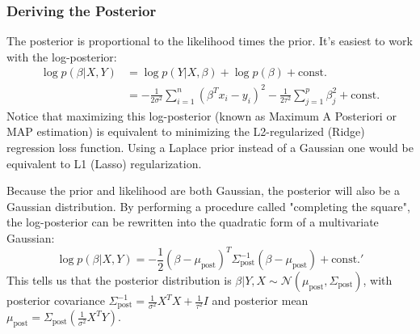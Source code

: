 \documentclass{article}
\begin{document}
\begin{multicols}{2}
	\subsubsection{Deriving the Posterior}
	The posterior is proportional to the likelihood times the prior. It's easiest to work with the log-posterior:
	\begin{align*}
		\log p(\beta|X, Y) & = \log p(Y|X, \beta) + \log p(\beta) + \text{const.}                                                                     \\
		                   & = -\frac{1}{2\sigma^2} \sum_{i=1}^{n} (\beta^T x_i - y_i)^2 - \frac{1}{2\tau^2} \sum_{j=1}^{p} \beta_j^2 + \text{const.}
	\end{align*}
	Notice that maximizing this log-posterior (known as Maximum A Posteriori or MAP estimation) is equivalent to minimizing the L2-regularized (Ridge) regression loss function. Using a Laplace prior instead of a Gaussian one would be equivalent to L1 (Lasso) regularization.

	Because the prior and likelihood are both Gaussian, the posterior will also be a Gaussian distribution. By performing a procedure called "completing the square", the log-posterior can be rewritten into the quadratic form of a multivariate Gaussian:
	$$ \log p(\beta|X,Y) = -\frac{1}{2}(\beta - \mu_{\text{post}})^T \Sigma_{\text{post}}^{-1}(\beta - \mu_{\text{post}}) + \text{const.}' $$
	This tells us that the posterior distribution is $\beta|Y, X \sim \mathcal{N}(\mu_{\text{post}}, \Sigma_{\text{post}})$, with posterior covariance $\Sigma_{\text{post}}^{-1} = \frac{1}{\sigma^2}X^T X + \frac{1}{\tau^2}I$ and posterior mean $\mu_{\text{post}} = \Sigma_{\text{post}}\left(\frac{1}{\sigma^2}X^T Y\right)$.


\end{multicols}
\end{document}
